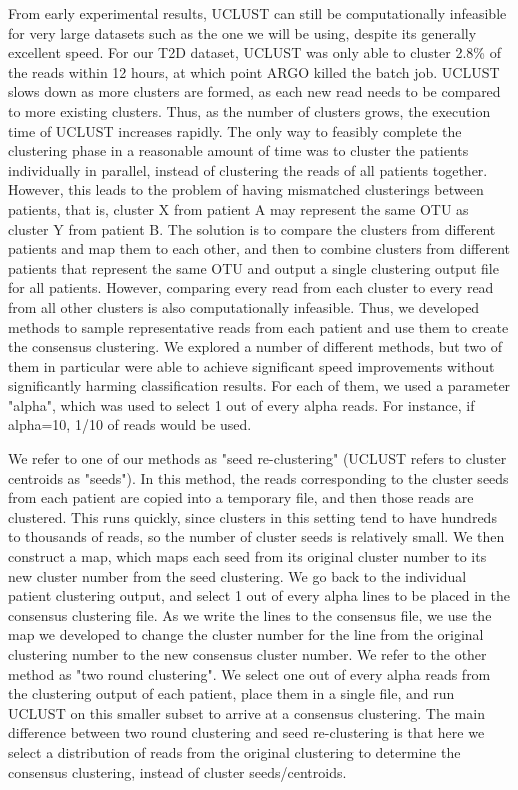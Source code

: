 From early experimental results, UCLUST can still be computationally infeasible for very large datasets such as the one we will be using, despite its generally excellent speed. For our T2D dataset, UCLUST was only able to cluster 2.8\% of the reads within 12 hours, at which point ARGO killed the batch job. UCLUST slows down as more clusters are formed, as each new read needs to be compared to more existing clusters. Thus, as the number of clusters grows, the execution time of UCLUST increases rapidly. The only way to feasibly complete the clustering phase in a reasonable amount of time was to cluster the patients individually in parallel, instead of clustering the reads of all patients together. However, this leads to the problem of having mismatched clusterings between patients, that is, cluster X from patient A may represent the same OTU as cluster Y from patient B. The solution is to compare the clusters from different patients and map them to each other, and then to combine clusters from different patients that represent the same OTU and output a single clustering output file for all patients. However, comparing every read from each cluster to every read from all other clusters is also computationally infeasible. Thus, we developed methods to sample representative reads from each patient and use them to create the consensus clustering. We explored a number of different methods, but two of them in particular were able to achieve significant speed improvements without significantly harming classification results. For each of them, we used a parameter "alpha", which was used to select 1 out of every alpha reads. For instance, if alpha=10, 1/10 of reads would be used. 

We refer to one of our methods as "seed re-clustering" (UCLUST refers to cluster centroids as "seeds"). In this method, the reads corresponding to the cluster seeds from each patient are copied into a temporary file, and then those reads are clustered. This runs quickly, since clusters in this setting tend to have hundreds to thousands of reads, so the number of cluster seeds is relatively small. We then construct a map, which maps each seed from its original cluster number to its new cluster number from the seed clustering. We go back to the individual patient clustering output, and select 1 out of every alpha lines to be placed in the consensus clustering file. As we write the lines to the consensus file, we use the map we developed to change the cluster number for the line from the original clustering number to the new consensus cluster number. We refer to the other method as "two round clustering". We select one out of every alpha reads from the clustering output of each patient, place them in a single file, and run UCLUST on this smaller subset to arrive at a consensus clustering. The main difference between two round clustering and seed re-clustering is that here we select a distribution of reads from the original clustering to determine the consensus clustering, instead of cluster seeds/centroids.

